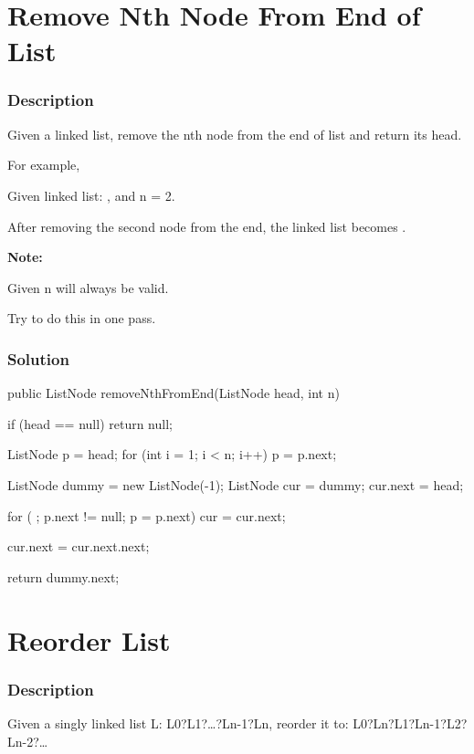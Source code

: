 \newpage

\section{Remove Nth Node From End of List} %

\subsubsection{Description}
Given a linked list, remove the nth node from the end of list and return its head.

For example,

   Given linked list: , and n = 2.

   After removing the second node from the end, the linked list becomes .

\textbf{Note:}

Given n will always be valid.

Try to do this in one pass.

\subsubsection{Solution}

\begin{Code}
public ListNode removeNthFromEnd(ListNode head, int n) {
    if (head == null) {
        return null;
    }

    ListNode p = head;
    for (int i = 1; i < n; i++) {
        p = p.next;
    }

    ListNode dummy = new ListNode(-1);
    ListNode cur = dummy;
    cur.next = head;

    for ( ; p.next != null; p = p.next) {
        cur = cur.next;
    }

    cur.next = cur.next.next;

    return dummy.next;
}
\end{Code}

\newpage

\section{Reorder List} %

\subsubsection{Description}
Given a singly linked list L: L0?L1?…?Ln-1?Ln,
reorder it to: L0?Ln?L1?Ln-1?L2?Ln-2?…


